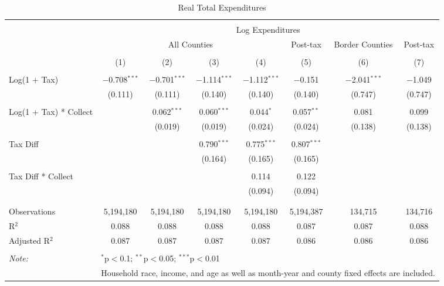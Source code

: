 
\begin{table}[!htbp] \centering 
  \caption{Real Total Expenditures} 
  \label{} 
\begin{tabular}{@{\extracolsep{5pt}}lccccccc} 
\\[-1.8ex]\hline 
\hline \\[-1.8ex] 
 & \multicolumn{7}{c}{Log Expenditures} \\ 
\cline{2-8} 
 & \multicolumn{4}{c}{All Counties} & Post-tax & Border Counties & Post-tax \\ 
\\[-1.8ex] & (1) & (2) & (3) & (4) & (5) & (6) & (7)\\ 
\hline \\[-1.8ex] 
 Log(1 + Tax) & $-$0.708$^{***}$ & $-$0.701$^{***}$ & $-$1.114$^{***}$ & $-$1.112$^{***}$ & $-$0.151 & $-$2.041$^{***}$ & $-$1.049 \\ 
  & (0.111) & (0.111) & (0.140) & (0.140) & (0.140) & (0.747) & (0.747) \\ 
  & & & & & & & \\ 
 Log(1 + Tax) * Collect &  & 0.062$^{***}$ & 0.060$^{***}$ & 0.044$^{*}$ & 0.057$^{**}$ & 0.081 & 0.099 \\ 
  &  & (0.019) & (0.019) & (0.024) & (0.024) & (0.138) & (0.138) \\ 
  & & & & & & & \\ 
 Tax Diff &  &  & 0.790$^{***}$ & 0.775$^{***}$ & 0.807$^{***}$ &  &  \\ 
  &  &  & (0.164) & (0.165) & (0.165) &  &  \\ 
  & & & & & & & \\ 
 Tax Diff * Collect &  &  &  & 0.114 & 0.122 &  &  \\ 
  &  &  &  & (0.094) & (0.094) &  &  \\ 
  & & & & & & & \\ 
\hline \\[-1.8ex] 
Observations & 5,194,180 & 5,194,180 & 5,194,180 & 5,194,180 & 5,194,387 & 134,715 & 134,716 \\ 
R$^{2}$ & 0.088 & 0.088 & 0.088 & 0.088 & 0.087 & 0.087 & 0.088 \\ 
Adjusted R$^{2}$ & 0.087 & 0.087 & 0.087 & 0.087 & 0.086 & 0.086 & 0.086 \\ 
\hline 
\hline \\[-1.8ex] 
\textit{Note:}  & \multicolumn{7}{l}{$^{*}$p$<$0.1; $^{**}$p$<$0.05; $^{***}$p$<$0.01} \\ 
 & \multicolumn{7}{l}{Household race, income, and age as well as month-year and county fixed effects are included.} \\ 
\end{tabular} 
\end{table} 
